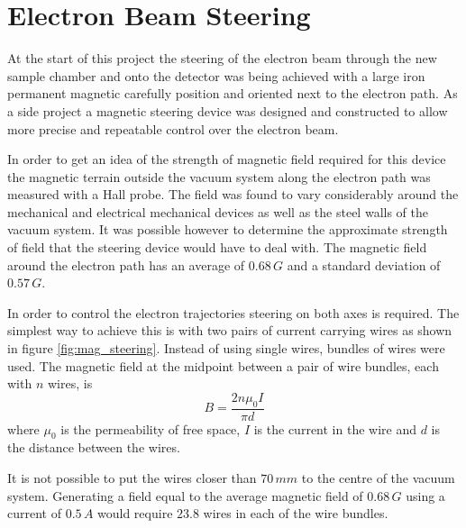\section{Electron Beam Steering}
At the start of this project the steering of the electron beam through the new sample chamber and onto the detector was being achieved with a large iron permanent magnetic carefully position and oriented next to the electron path. As a side project a magnetic steering device was designed and constructed to allow more precise and repeatable control over the electron beam.

In order to get an idea of the strength of magnetic field required for this device the magnetic terrain outside the vacuum system along the electron path was measured with a Hall probe. The field was found to vary considerably around the mechanical and electrical mechanical devices as well as the steel walls of the vacuum system. It was possible however to determine the approximate strength of field that the steering device would have to deal with. The magnetic field around the electron path has an average of $0.68\,\unit{G}$ and a standard deviation of $0.57\,\unit{G}$.

In order to control the electron trajectories steering on both axes is required. The simplest way to achieve this is with two pairs of current carrying wires as shown in figure \ref{fig:mag_steering}. Instead of using single wires, bundles of wires were used. The magnetic field at the midpoint between a pair of wire bundles, each with $n$ wires, is
\begin{equation}
B=\frac{2n\mu_0I}{\pi d}
\end{equation}
where $\mu_0$ is the permeability of free space, $I$ is the current in the wire and $d$ is the distance between the wires.

It is not possible to put the wires closer than $70\,\unit{mm}$ to the centre of the vacuum system. Generating a field equal to the average magnetic field of $0.68\,\unit{G}$ using a current of $0.5\,\unit{A}$ would require $23.8$ wires in each of the wire bundles.

